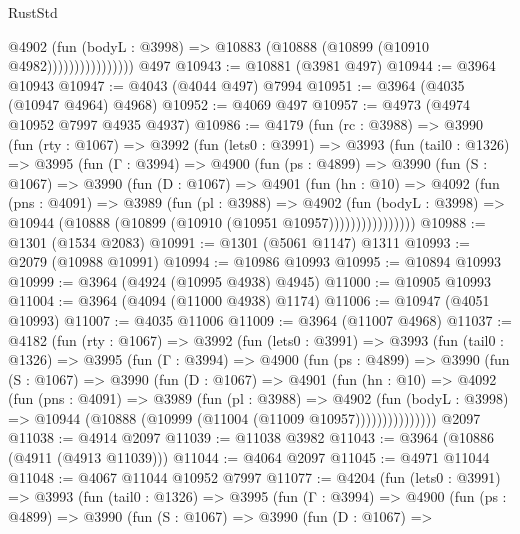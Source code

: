 \begin{lexlean}{RustStd}
\begin{coremodule}
{\begin{coremodule}
{{{{{{{{{{{{{{{{{{{{{{{{{{{{{{{{{{{{{{                          @4902
                            (fun (bodyL : @3998) =>
                            @10883 (@10888 (@10899 (@10910 @4982))))))))))))))))
    @497
@10943 := @10881 (@3981 @497)
@10944 := @3964 @10943
@10947 := @4043 (@4044 @497) @7994
@10951 := @3964 (@4035 (@10947 @4964) @4968)
@10952 := @4069 @497
@10957 := @4973 (@4974 @10952 @7997 @4935 @4937)
@10986 := @4179
    (fun (rc : @3988) =>
    @3990
      (fun (rty : @1067) =>
      @3992
        (fun (lets0 : @3991) =>
        @3993
          (fun (tail0 : @1326) =>
          @3995
            (fun (Γ : @3994) =>
            @4900
              (fun (ps : @4899) =>
              @3990
                (fun (S : @1067) =>
                @3990
                  (fun (D : @1067) =>
                  @4901
                    (fun (hn : @10) =>
                    @4092
                      (fun (pns : @4091) =>
                      @3989
                        (fun (pl : @3988) =>
                        @4902
                          (fun (bodyL : @3998) =>
                          @10944 (@10888 (@10899 (@10910 (@10951 @10957))))))))))))))))
@10988 := @1301 (@1534 @2083)
@10991 := @1301 (@5061 @1147) @1311
@10993 := @2079 (@10988 @10991)
@10994 := @10986 @10993
@10995 := @10894 @10993
@10999 := @3964 (@4924 (@10995 @4938) @4945)
@11000 := @10905 @10993
@11004 := @3964 (@4094 (@11000 @4938) @1174)
@11006 := @10947 (@4051 @10993)
@11007 := @4035 @11006
@11009 := @3964 (@11007 @4968)
@11037 := @4182
    (fun (rty : @1067) =>
    @3992
      (fun (lets0 : @3991) =>
      @3993
        (fun (tail0 : @1326) =>
        @3995
          (fun (Γ : @3994) =>
          @4900
            (fun (ps : @4899) =>
            @3990
              (fun (S : @1067) =>
              @3990
                (fun (D : @1067) =>
                @4901
                  (fun (hn : @10) =>
                  @4092
                    (fun (pns : @4091) =>
                    @3989
                      (fun (pl : @3988) =>
                      @4902
                        (fun (bodyL : @3998) =>
                        @10944 (@10888 (@10999 (@11004 (@11009 @10957)))))))))))))))
    @2097
@11038 := @4914 @2097
@11039 := @11038 @3982
@11043 := @3964 (@10886 (@4911 (@4913 @11039)))
@11044 := @4064 @2097
@11045 := @4971 @11044
@11048 := @4067 @11044 @10952 @7997
@11077 := @4204
    (fun (lets0 : @3991) =>
    @3993
      (fun (tail0 : @1326) =>
      @3995
        (fun (Γ : @3994) =>
        @4900
          (fun (ps : @4899) =>
          @3990
            (fun (S : @1067) =>
            @3990
              (fun (D : @1067) =>
}}}}}}}}}}}}}}}}}}}}}}}}}}}}}}}}}}}}}}
\end{coremodule}}
\end{coremodule}
\end{lexlean}
